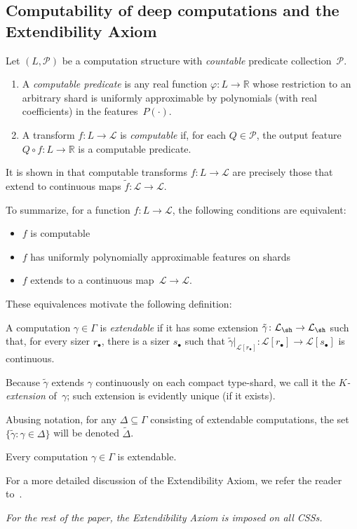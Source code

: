 \subsection{Computability of deep computations and the Extendibility Axiom}
Let $(L, \mathcal{P})$ be a computation structure with \emph{countable} predicate collection~$\mathcal{P}$.

\begin{enumerate}
\item A \emph{computable predicate} is any real function $\varphi\colon L\to \mathbb{R}$ whose restriction to an arbitrary shard is uniformly approximable by polynomials (with real coefficients) in the features~$P(\cdot)$.
\item A transform $f\colon L\to \mathcal{L}$ is \emph{computable} if, for each $Q\in\mathcal{P}$, the output feature $Q{\circ}f\colon L\to\mathbb{R}$ is a computable predicate.
\end{enumerate}

It is shown in \cite{alva2024approximability} that computable transforms $f\colon L\to\mathcal{L}$ are precisely those that extend to continuous maps $\tilde{f}\colon \mathcal{L} \to \mathcal{L}$.

To summarize, for a function $f\colon L\to \mathcal{L}$, the following conditions are equivalent:

\begin{itemize}
    \item $f$ is computable
    \item $f$ has uniformly polynomially approximable features on shards
    \item $f$ extends to a continuous map~$\mathcal{L}\to \mathcal{L}$.
\end{itemize}

These equivalences motivate the following definition:

A computation $\gamma\in \Gamma$ is \emph{extendable} if it has some extension $\tilde\gamma\colon\mathcal{L}_{\sh}\to\mathcal{L}_{\sh}$ such that, for every sizer $r_{\bullet}$, there is a sizer $s_\bullet$ such that $\tilde\gamma|_{\mathcal{L}[r_\bullet]}\colon\mathcal{L}[r_\bullet]\to\mathcal{L}[s_\bullet]$ is continuous.

Because $\tilde{\gamma}$ extends $\gamma$ continuously on each compact type-shard, we call it the \emph{$K$-extension} of~$\gamma$; such extension is evidently unique (if it exists).

Abusing notation, for any $\Delta\subseteq\Gamma$ consisting of extendable computations, the set $\{\tilde\gamma\colon\gamma\in\Delta\}$ will be denoted $\tilde{\Delta}$.

\begin{AxExt}\label{ax:extendibility-axiom}
    Every computation $\gamma\in\Gamma$ is extendable.
\end{AxExt}

For a more detailed discussion of the Extendibility Axiom, we refer the reader to~\cite{alva2024approximability}.

\emph{For the rest of the paper, the Extendibility Axiom is imposed on all CSSs.}
